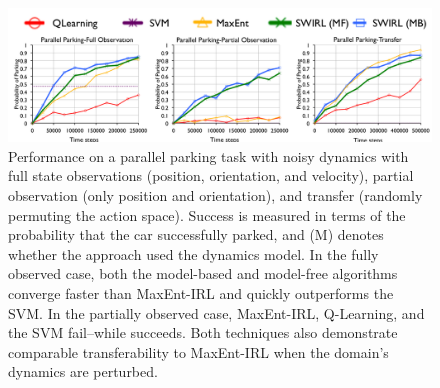 \begin{figure}[t]
\centering
 \includegraphics[width=\columnwidth]{exp/rc-convergence-1.png}
 \caption{Performance on a parallel parking task with noisy dynamics with full state observations (position, orientation, and velocity), partial observation (only position and orientation), and transfer (randomly permuting the action space).
 Success is measured in terms of the probability that the car successfully parked, and (M) denotes whether the approach used the dynamics model.
 In the fully observed case, both the model-based and model-free \hirl algorithms converge faster than MaxEnt-IRL and quickly outperforms the SVM.
 In the partially observed case, MaxEnt-IRL, Q-Learning, and the SVM fail--while \hirl succeeds.
 Both techniques also demonstrate comparable transferability to MaxEnt-IRL when the domain's dynamics are perturbed.
\label{exp:rcsegmentation-res}}
\end{figure}

